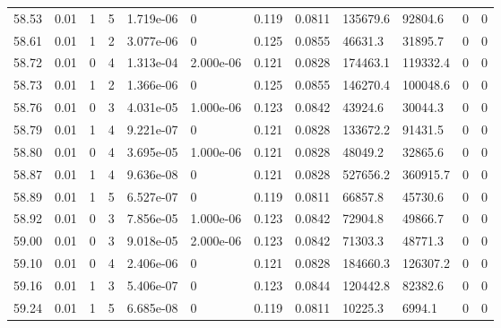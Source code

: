 \documentclass[preview]{standalone}
\begin{document}
{{{{{{{{{{{{{{{{\begin{tabular}{L{1.2cm}C{1.2cm} C{0.3cm}C{0.5cm} C{1.4cm}C{1.4cm} C{1.4cm}C{1.4cm} C{1.6cm}C{1.6cm} C{1.6cm}C{1.6cm}}
  58.53  &  0.01  & 1     &  5 &  1.719e-06  & 0  &  0.119&   0.0811& 135679.6 & 92804.6   &  0 & 0  \\ 
  58.61  &  0.01  & 1     &  2 &  3.077e-06  & 0  &  0.125&   0.0855& 46631.3 & 31895.7   &  0 & 0  \\ 
  58.72  &  0.01  & 0     &  4 &  1.313e-04  & 2.000e-06  &  0.121&   0.0828& 174463.1 & 119332.4   &  0 & 0  \\ 
  58.73  &  0.01  & 1     &  2 &  1.366e-06  & 0  &  0.125&   0.0855& 146270.4 & 100048.6   &  0 & 0  \\ 
  58.76  &  0.01  & 0     &  3 &  4.031e-05  & 1.000e-06  &  0.123&   0.0842& 43924.6 & 30044.3   &  0 & 0  \\ 
  58.79  &  0.01  & 1     &  4 &  9.221e-07  & 0  &  0.121&   0.0828& 133672.2 & 91431.5   &  0 & 0  \\ 
  58.80  &  0.01  & 0     &  4 &  3.695e-05  & 1.000e-06  &  0.121&   0.0828& 48049.2 & 32865.6   &  0 & 0  \\ 
  58.87  &  0.01  & 1     &  4 &  9.636e-08  & 0  &  0.121&   0.0828& 527656.2 & 360915.7   &  0 & 0  \\ 
  58.89  &  0.01  & 1     &  5 &  6.527e-07  & 0  &  0.119&   0.0811& 66857.8 & 45730.6   &  0 & 0  \\ 
  58.92  &  0.01  & 0     &  3 &  7.856e-05  & 1.000e-06  &  0.123&   0.0842& 72904.8 & 49866.7   &  0 & 0  \\ 
  59.00  &  0.01  & 0     &  3 &  9.018e-05  & 2.000e-06  &  0.123&   0.0842& 71303.3 & 48771.3   &  0 & 0  \\ 
  59.10  &  0.01  & 0     &  4 &  2.406e-06  & 0  &  0.121&   0.0828& 184660.3 & 126307.2   &  0 & 0  \\ 
  59.16  &  0.01  & 1     &  3 &  5.406e-07  & 0  &  0.123&   0.0844& 120442.8 & 82382.6   &  0 & 0  \\ 
  59.24  &  0.01  & 1     &  5 &  6.685e-08  & 0  &  0.119&   0.0811& 10225.3 & 6994.1   &  0 & 0  \\ 
\hline 
\end{tabular} 

}}}}}}}}}}}}}}}}
\end{document}

